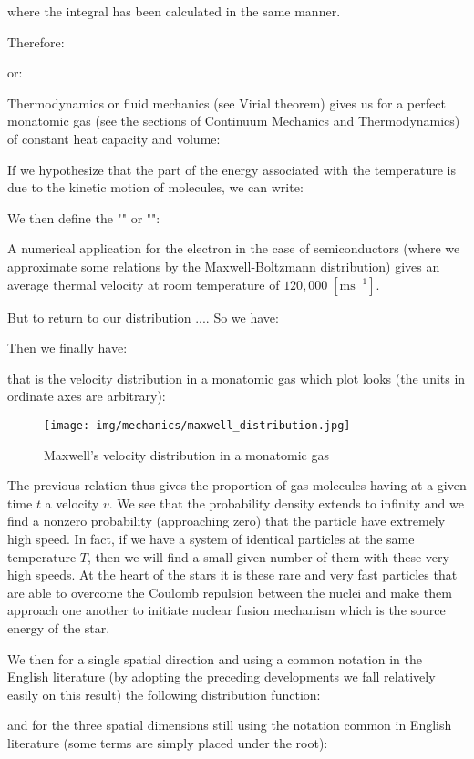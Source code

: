	where the integral has been calculated in the same manner.
	
	Therefore:
	
	or:
	
	Thermodynamics or fluid mechanics (see Virial theorem) gives us for a perfect monatomic gas (see the sections of Continuum Mechanics and Thermodynamics) of constant heat capacity and volume:
	
	If we hypothesize that the part of the energy associated with the temperature is due to the kinetic motion of molecules, we can write:
	
	We then define the "" or "":
	
	A numerical application for the electron in the case of semiconductors (where we approximate some relations by the Maxwell-Boltzmann distribution) gives an average thermal velocity at room temperature of $120,000\;[\text{ms}^{-1}]$.
	
	But to return to our distribution .... So we have:
	
	Then we finally have:
	
	that is the velocity distribution in a monatomic gas which plot looks (the units in ordinate axes are arbitrary):
	\begin{figure}[H]
		\centering
		\texttt{[image: img/mechanics/maxwell\_distribution.jpg]}
		\caption{Maxwell's velocity distribution in a monatomic gas}
	\end{figure}
	The previous relation thus gives the proportion of gas molecules having at a given time $t$ a velocity $v$. We see that the probability density extends to infinity and we find a nonzero probability (approaching zero) that the particle have extremely high speed. In fact, if we have a system of identical particles at the same temperature $T$, then we will find a small given number of them with these very high speeds. At the heart of the stars it is these rare and very fast particles that are able to overcome the Coulomb repulsion between the nuclei and make them approach one another to initiate nuclear fusion mechanism which is the source energy of the star.
	
	We then for a single spatial direction and using a common notation in the English literature (by adopting the preceding developments we fall relatively easily on this result) the following distribution function:
	
	and for the three spatial dimensions still using the notation common in English literature (some terms are simply placed under the root):
	
